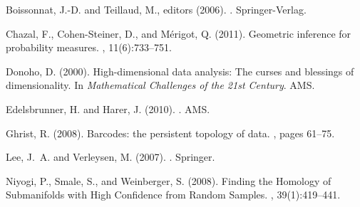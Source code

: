 \begin{thebibliography}{}
{
Boissonnat, J.-D. and Teillaud, M., editors (2006).
.
\newblock Springer-Verlag.
\vspace{-2.4mm}

Chazal, F., Cohen-Steiner, D., and M\'erigot, Q. (2011).
\newblock Geometric inference for probability measures.
,
  11(6):733--751.
\vspace{-2.4mm}

Donoho, D. (2000).
\newblock High-dimensional data analysis: The curses and blessings of
  dimensionality.
\newblock In {\em Mathematical Challenges of the 21st Century}. AMS.
\vspace{-2.4mm}

Edelsbrunner, H. and Harer, J. (2010).
.
\newblock AMS.%
\vspace{-2.4mm}

Ghrist, R. (2008).
\newblock Barcodes: the persistent topology of data.
, pages 61--75.
\vspace{-2.4mm}

Lee, J.~A. and Verleysen, M. (2007).
.
\newblock Springer.
\vspace{-2.4mm}

Niyogi, P., Smale, S., and Weinberger, S. (2008).
\newblock Finding the {H}omology of {S}ubmanifolds with {H}igh {C}onfidence
  from {R}andom {S}amples.
, 39(1):419--441.

}

\end{thebibliography}
